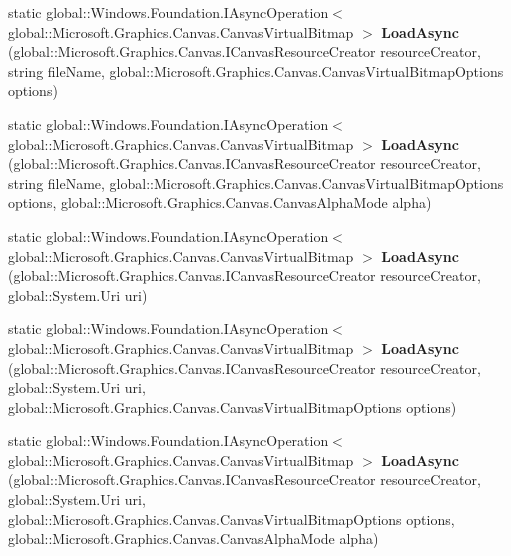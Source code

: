 \begin{DoxyCompactItemize}
static global\+::\+Windows.\+Foundation.\+I\+Async\+Operation$<$ global\+::\+Microsoft.\+Graphics.\+Canvas.\+Canvas\+Virtual\+Bitmap $>$ {\bfseries Load\+Async} (global\+::\+Microsoft.\+Graphics.\+Canvas.\+I\+Canvas\+Resource\+Creator resource\+Creator, string file\+Name, global\+::\+Microsoft.\+Graphics.\+Canvas.\+Canvas\+Virtual\+Bitmap\+Options options)
\item 
\mbox{\label{class_microsoft_1_1_graphics_1_1_canvas_1_1_canvas_virtual_bitmap_a72cf413902f0758c4707d6fc9c560914}} 
static global\+::\+Windows.\+Foundation.\+I\+Async\+Operation$<$ global\+::\+Microsoft.\+Graphics.\+Canvas.\+Canvas\+Virtual\+Bitmap $>$ {\bfseries Load\+Async} (global\+::\+Microsoft.\+Graphics.\+Canvas.\+I\+Canvas\+Resource\+Creator resource\+Creator, string file\+Name, global\+::\+Microsoft.\+Graphics.\+Canvas.\+Canvas\+Virtual\+Bitmap\+Options options, global\+::\+Microsoft.\+Graphics.\+Canvas.\+Canvas\+Alpha\+Mode alpha)
\item 
\mbox{\label{class_microsoft_1_1_graphics_1_1_canvas_1_1_canvas_virtual_bitmap_ad38275a64145b2d51079b6c5e251fab4}} 
static global\+::\+Windows.\+Foundation.\+I\+Async\+Operation$<$ global\+::\+Microsoft.\+Graphics.\+Canvas.\+Canvas\+Virtual\+Bitmap $>$ {\bfseries Load\+Async} (global\+::\+Microsoft.\+Graphics.\+Canvas.\+I\+Canvas\+Resource\+Creator resource\+Creator, global\+::\+System.\+Uri uri)
\item 
\mbox{\label{class_microsoft_1_1_graphics_1_1_canvas_1_1_canvas_virtual_bitmap_acd074c002643745470070fedca4bc142}} 
static global\+::\+Windows.\+Foundation.\+I\+Async\+Operation$<$ global\+::\+Microsoft.\+Graphics.\+Canvas.\+Canvas\+Virtual\+Bitmap $>$ {\bfseries Load\+Async} (global\+::\+Microsoft.\+Graphics.\+Canvas.\+I\+Canvas\+Resource\+Creator resource\+Creator, global\+::\+System.\+Uri uri, global\+::\+Microsoft.\+Graphics.\+Canvas.\+Canvas\+Virtual\+Bitmap\+Options options)
\item 
\mbox{\label{class_microsoft_1_1_graphics_1_1_canvas_1_1_canvas_virtual_bitmap_accb66d38d50f8d67a23664ce8819c262}} 
static global\+::\+Windows.\+Foundation.\+I\+Async\+Operation$<$ global\+::\+Microsoft.\+Graphics.\+Canvas.\+Canvas\+Virtual\+Bitmap $>$ {\bfseries Load\+Async} (global\+::\+Microsoft.\+Graphics.\+Canvas.\+I\+Canvas\+Resource\+Creator resource\+Creator, global\+::\+System.\+Uri uri, global\+::\+Microsoft.\+Graphics.\+Canvas.\+Canvas\+Virtual\+Bitmap\+Options options, global\+::\+Microsoft.\+Graphics.\+Canvas.\+Canvas\+Alpha\+Mode alpha)

\end{DoxyCompactItemize}

